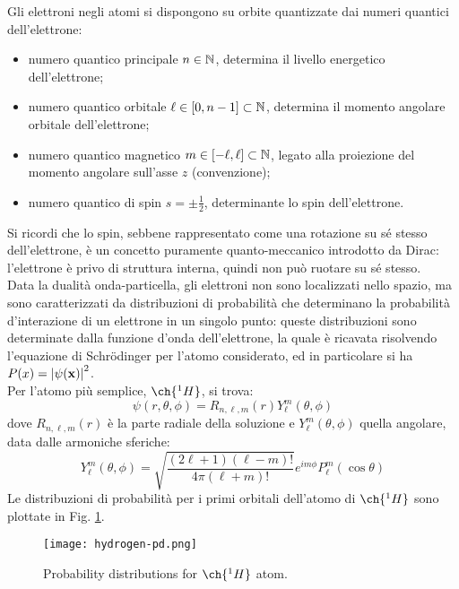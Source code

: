 Gli elettroni negli atomi si dispongono su orbite quantizzate dai numeri quantici dell'elettrone:
\begin{itemize}
	\item numero quantico principale $ n \in \mathbb{N} $, determina il livello energetico dell'elettrone;
	\item numero quantico orbitale $ \ell \in \left[ 0, n-1 \right] \subset \mathbb{N} $, determina il momento angolare orbitale dell'elettrone;
	\item numero quantico magnetico $ m \in \left[ -\ell, \ell \right] \subset \mathbb{N} $, legato alla proiezione del momento angolare sull'asse $ z $ (convenzione);
	\item numero quantico di spin $ s = \pm \frac{1}{2} $, determinante lo spin dell'elettrone.
\end{itemize}
Si ricordi che lo spin, sebbene rappresentato come una rotazione su sé stesso dell'elettrone, è un concetto puramente quanto-meccanico introdotto da Dirac: l'elettrone è privo di struttura interna, quindi non può ruotare su sé stesso.\\
Data la dualità onda-particella, gli elettroni non sono localizzati nello spazio, ma sono caratterizzati da distribuzioni di probabilità che determinano la probabilità d'interazione di un elettrone in un singolo punto: queste distribuzioni sono determinate dalla funzione d'onda dell'elettrone, la quale è ricavata risolvendo l'equazione di Schrödinger per l'atomo considerato, ed in particolare si ha $ P(x) = \left\lvert\psi(\mathbf{x})\right\rvert^2 $.\\
Per l'atomo più semplice, $ \ch{^1 H} $, si trova:
\begin{equation}
	\psi(r,\theta,\phi) = R_{n,\ell,m}(r) Y_{\ell}^m(\theta,\phi)
	\label{eq:1.31}
\end{equation}
dove $ R_{n,\ell,m}(r) $ è la parte radiale della soluzione e $ Y_{\ell}^m(\theta,\phi) $ quella angolare, data dalle armoniche sferiche:
\begin{equation}
	Y_{\ell}^m(\theta,\phi) = \sqrt{\frac{(2\ell+1)(\ell-m)!}{4\pi(\ell+m)!}} e^{im\phi} P_{\ell}^m(\cos\theta)
	\label{eq:1.32}
\end{equation}
Le distribuzioni di probabilità per i primi orbitali dell'atomo di $ \ch{^1 H} $ sono plottate in Fig. \ref{hyd-pd}.
\begin{figure}
	\centering
	\texttt{[image: hydrogen-pd.png]}
	\caption{Probability distributions for $ \ch{^1 H} $ atom.}
	\label{hyd-pd}
\end{figure}

